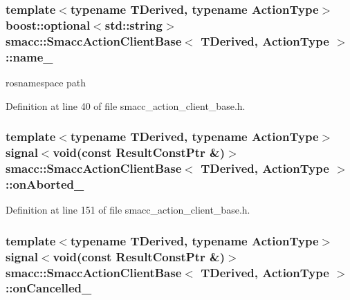 \subsubsection[{\texorpdfstring{name\+\_\+}{name_}}]{\setlength{\rightskip}{0pt plus 5cm}template$<$typename T\+Derived, typename Action\+Type$>$ boost\+::optional$<$std\+::string$>$ {\bf smacc\+::\+Smacc\+Action\+Client\+Base}$<$ T\+Derived, Action\+Type $>$\+::name\+\_\+}\hypertarget{classsmacc_1_1SmaccActionClientBase_a7fa0e4b63069bea12d47a83bd0be73d7}{}\label{classsmacc_1_1SmaccActionClientBase_a7fa0e4b63069bea12d47a83bd0be73d7}


rosnamespace path 



Definition at line 40 of file smacc\+\_\+action\+\_\+client\+\_\+base.\+h.

\subsubsection[{\texorpdfstring{on\+Aborted\+\_\+}{onAborted_}}]{\setlength{\rightskip}{0pt plus 5cm}template$<$typename T\+Derived, typename Action\+Type$>$ signal$<$void(const Result\+Const\+Ptr \&)$>$ {\bf smacc\+::\+Smacc\+Action\+Client\+Base}$<$ T\+Derived, Action\+Type $>$\+::on\+Aborted\+\_\+\hspace{0.3cm}{\ttfamily [protected]}}\hypertarget{classsmacc_1_1SmaccActionClientBase_acb66868d20faa3c5d7065991b4a306ec}{}\label{classsmacc_1_1SmaccActionClientBase_acb66868d20faa3c5d7065991b4a306ec}


Definition at line 151 of file smacc\+\_\+action\+\_\+client\+\_\+base.\+h.

\subsubsection[{\texorpdfstring{on\+Cancelled\+\_\+}{onCancelled_}}]{\setlength{\rightskip}{0pt plus 5cm}template$<$typename T\+Derived, typename Action\+Type$>$ signal$<$void(const Result\+Const\+Ptr \&)$>$ {\bf smacc\+::\+Smacc\+Action\+Client\+Base}$<$ T\+Derived, Action\+Type $>$\+::on\+Cancelled\+\_\+\hspace{0.3cm}{\ttfamily [protected]}}\hypertarget{classsmacc_1_1SmaccActionClientBase_a5b27bf8941692efb4f98d0747bcbfb7e}{}\label{classsmacc_1_1SmaccActionClientBase_a5b27bf8941692efb4f98d0747bcbfb7e}


